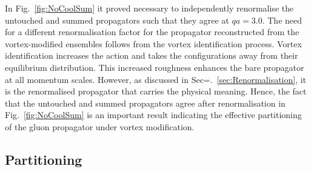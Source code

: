 \clearpage
In Fig.~\ref{fig:NoCoolSum} it proved necessary to independently renormalise the untouched and summed propagators such that they agree at $qa=3.0$. The need for a different renormalisation factor for the propagator reconstructed from the vortex-modified ensembles follows from the vortex identification process. Vortex identification increases the action and takes the configurations away from their equilibrium distribution. This increased roughness enhances the bare propagator at all momentum scales. However, as discussed in Sec=.~\ref{sec:Renormalisation}, it is the renormalised propagator that carries the physical meaning. Hence, the fact that the untouched and summed propagators agree after renormalisation in Fig.~\ref{fig:NoCoolSum} is an important result indicating the effective partitioning of the gluon propagator under vortex modification.

\subsection{Partitioning}

